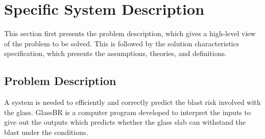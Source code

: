 \documentclass[12pt]{article}
\begin{document}
\section{Specific System Description}
\label{Sec:SpecSystDesc}
This section first presents the problem description, which gives a high-level view of the problem to be solved. This is followed by the solution characteristics specification, which presents the assumptions, theories, and definitions.
\subsection{Problem Description}
\label{Sec:ProbDesc}
A system is needed to efficiently and correctly predict the blast risk involved with the glass. GlassBR is a computer program developed to interpret the inputs to give out the outputs which predicts whether the glass slab can withstand the blast under the conditions.
\end{document}
